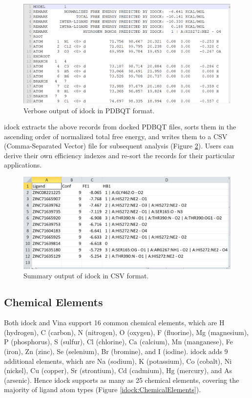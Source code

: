 \begin{figure}
\centering
\includegraphics[width=\textwidth]{idock/OutputPDBQT.png}
\caption{Verbose output of idock in PDBQT format.}
\label{idock:OutputPDBQT}
\end{figure}

idock extracts the above records from docked PDBQT files, sorts them in the ascending order of normalized total free energy, and writes them to a CSV (Comma-Separated Vector) file for subsequent analysis (Figure \ref{idock:OutputCSV}). Users can derive their own efficiency indexes \citep{335,336,337} and re-sort the records for their particular applications.

\begin{figure}
\centering
\includegraphics[width=\textwidth]{idock/OutputCSV.png}
\caption{Summary output of idock in CSV format.}
\label{idock:OutputCSV}
\end{figure}

\subsection{Chemical Elements}

Both idock and Vina support 16 common chemical elements, which are H (hydrogen), C (carbon), N (nitrogen), O (oxygen), F (fluorine), Mg (magnesium), P (phosphorus), S (sulfur), Cl (chlorine), Ca (calcium), Mn (manganese), Fe (iron), Zn (zinc), Se (selenium), Br (bromine), and I (iodine). idock adds 9 additional elements, which are Na (sodium), K (potassium), Co (cobalt), Ni (nickel), Cu (copper), Sr (strontium), Cd (cadmium), Hg (mercury), and As (arsenic). Hence idock supports as many as 25 chemical elements, covering the majority of ligand atom types (Figure \ref{idock:ChemicalElements}).

